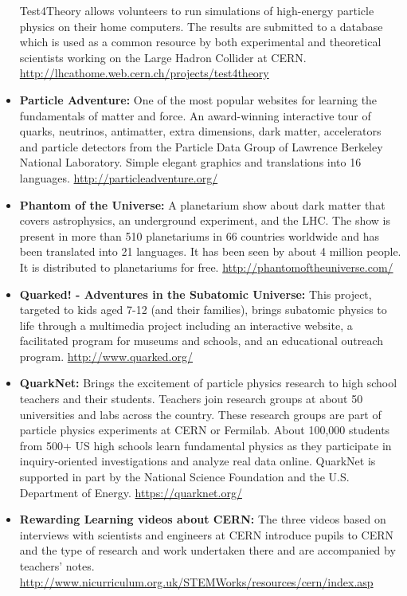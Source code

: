 \begin{itemize}
  Test4Theory allows volunteers to run simulations of high-energy
  particle physics on their home computers. The results are submitted to
  a database which is used as a common resource by both experimental and
  theoretical scientists working on the Large Hadron Collider at CERN.
  \url{http://lhcathome.web.cern.ch/projects/test4theory}
\item
  \textbf{Particle Adventure:} One of the most popular websites for
  learning the fundamentals of matter and force. An award-winning
  interactive tour of quarks, neutrinos, antimatter, extra dimensions,
  dark matter, accelerators and particle detectors from the Particle
  Data Group of Lawrence Berkeley National Laboratory. Simple elegant
  graphics and translations into 16 languages.
  \url{http://particleadventure.org/}
\item
  \textbf{Phantom of the Universe:} A planetarium show about dark matter
  that covers astrophysics, an underground experiment, and the LHC. The
  show is present in more than 510 planetariums in 66 countries
  worldwide and has been translated into 21 languages. It has been seen
  by about 4 million people. It is distributed to planetariums for free.
  \url{http://phantomoftheuniverse.com/}
\item
  \textbf{Quarked! - Adventures in the Subatomic Universe:} This
  project, targeted to kids aged 7-12 (and their families), brings
  subatomic physics to life through a multimedia project including an
  interactive website, a facilitated program for museums and schools,
  and an educational outreach program. \url{http://www.quarked.org/}
\item
  \textbf{QuarkNet:} Brings the excitement of particle physics research
  to high school teachers and their students. Teachers join research
  groups at about 50 universities and labs across the country. These
  research groups are part of particle physics experiments at CERN or
  Fermilab. About 100,000 students from 500+ US high schools learn
  fundamental physics as they participate in inquiry-oriented
  investigations and analyze real data online. QuarkNet is supported in
  part by the National Science Foundation and the U.S. Department of
  Energy. \url{https://quarknet.org/}
\item
  \textbf{Rewarding Learning videos about CERN:} The three videos based
  on interviews with scientists and engineers at CERN introduce pupils
  to CERN and the type of research and work undertaken there and are
  accompanied by teachers' notes.
  \url{http://www.nicurriculum.org.uk/STEMWorks/resources/cern/index.asp}
\end{itemize}

